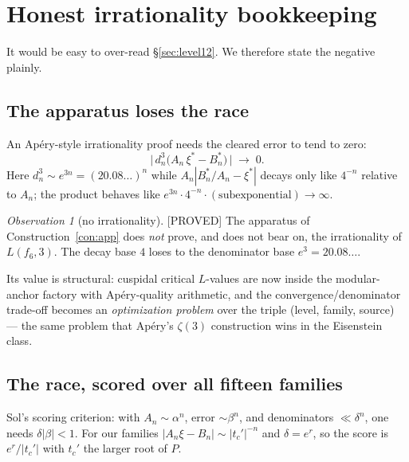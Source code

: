\documentclass[11pt,reqno]{amsart}
\theoremstyle{plain}
\theoremstyle{definition}
\theoremstyle{remark}
\newtheorem{observation}[theorem]{Observation}
\newcommand{\Proved}{\textup{\textsf{[PROVED]}}}
\begin{document}
\section{Honest irrationality bookkeeping}\label{sec:race}

It would be easy to over-read \S\ref{sec:level12}. We therefore state the
negative plainly.

\subsection{The apparatus loses the race}
An Ap\'ery-style irrationality proof needs the cleared error to tend to
zero:
\[
\bigl|\,d_n^{3}\bigl(A_n\,\xi^*-B^*_n\bigr)\,\bigr|\;\longrightarrow\;0 .
\]
Here $d_n^3\sim e^{3n}=(20.08\ldots)^n$ while $A_n|B^*_n/A_n-\xi^*|$ decays
only like $4^{-n}$ relative to $A_n$; the product behaves like
$e^{3n}\cdot4^{-n}\cdot(\text{subexponential})\to\infty$.

\begin{observation}[no irrationality]\label{obs:noirr}
\Proved{} The apparatus of Construction~\ref{con:app} does \emph{not}
prove, and does not bear on, the irrationality of $L(f_6,3)$. The
decay base $4$ loses to the denominator base $e^3=20.08\ldots$.
\end{observation}

Its value is structural: cuspidal critical $L$-values are now inside the
modular-anchor factory with Ap\'ery-quality arithmetic, and the
convergence/denominator trade-off becomes an \emph{optimization problem}
over the triple (level, family, source) --- the same problem that Ap\'ery's
$\zeta(3)$ construction wins in the Eisenstein class.

\subsection{The race, scored over all fifteen families}
Sol's scoring criterion: with $A_n\sim\alpha^n$, error $\sim\beta^n$, and
denominators $\ll\delta^n$, one needs $\delta|\beta|<1$. For our families
$|A_n\xi-B_n|\sim|t_c'|^{-n}$ and $\delta=e^{r}$, so the score is
$e^{r}/|t_c'|$ with $t_c'$ the larger root of $P$.
\end{document}
